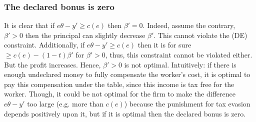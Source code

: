 \documentclass[a4paper]{article}
\begin{document}
\subsubsection{The declared bonus is zero}
It is clear that if $e \theta - y' \ge c(e)$ then $\beta' = 0$. Indeed, assume the contrary, $\beta' > 0$ then the principal can slightly decrease $\beta'$. This cannot violate the (DE) constraint. Additionally, if $e\theta - y' \ge c(e)$ then it is for sure $\ge c(e) - (1 - t)\beta'$ for $\beta'>0$, thus, this constraint cannot be violated either. But the profit increases. Hence, $\beta'>0$ is not optimal. Intuitively: if there is enough undeclared money to fully compensate the worker's cost, it is optimal to pay this compensation under the table, since this income is tax free for the worker. Though, it could be not optimal for the firm to make the difference $e\theta - y'$ too large (e.g. more than $c(e)$) because the punishment for tax evasion depends positively upon it, but if it is optimal then the declared bonus is zero.
\end{document}
